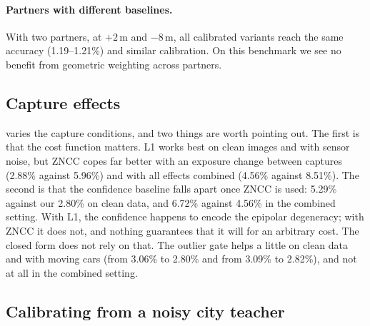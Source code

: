 \paragraph{Partners with different baselines.}
With two partners, at $+2$\,m and $-8$\,m, all calibrated variants reach the same accuracy
(1.19--1.21\%) and similar calibration. On this benchmark we see no benefit from geometric weighting
across partners.

\subsection{Capture effects}
\label{sec:capture}

\begin{table}[t]
  \centering
  \footnotesize
  \setlength{\tabcolsep}{1.8pt}
  
  \caption{\textbf{Capture effects} (median relative error, \%, 8 scenes). We apply an exposure change
  to the partner (gain 0.6, bias 0.15), add sensor noise ($\sigma=0.03$), move half of the parked
  cars by 3\,m between captures, and combine all three. Each cost function has its own calibration.}
  \label{tab:capture}
\end{table}

 varies the capture conditions, and two things are worth pointing out. The first is
that the cost function matters. L1 works best on clean images and with sensor noise, but ZNCC copes
far better with an exposure change between captures (2.88\% against 5.96\%) and with all effects
combined (4.56\% against 8.51\%). The second is that the confidence baseline falls apart once ZNCC is
used: 5.29\% against our 2.80\% on clean data, and 6.72\% against 4.56\% in the combined setting. With
L1, the confidence happens to encode the epipolar degeneracy; with ZNCC it does not, and nothing
guarantees that it will for an arbitrary cost. The closed form does not rely on that. The outlier gate
helps a little on clean data and with moving cars (from 3.06\% to 2.80\% and from 3.09\% to 2.82\%),
and not at all in the combined setting.

\subsection{Calibrating from a noisy city teacher}
\label{sec:teacher_cal}

\begin{table}[t]
  \centering
  \footnotesize
  \setlength{\tabcolsep}{3pt}
  
  \caption{\textbf{Calibration data.} The precision model of \cref{eq:calibration} is fitted on depth
  from a simulated city teacher instead of ground truth: 7 panoramas per street with lateral offsets,
  each point displaced by a draw from its own triangulation covariance, and 0.5\,px matching at
  2048\,px width. Evaluation as in \cref{tab:main}.}
  \label{tab:teacher}
\end{table}

